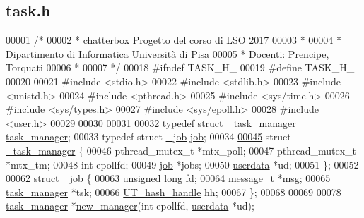 \hypertarget{task_8h_source}{}\subsection{task.\+h}

\begin{DoxyCode}
00001 \textcolor{comment}{/*}
00002 \textcolor{comment}{ * chatterbox Progetto del corso di LSO 2017}
00003 \textcolor{comment}{ *}
00004 \textcolor{comment}{ * Dipartimento di Informatica Università di Pisa}
00005 \textcolor{comment}{ * Docenti: Prencipe, Torquati}
00006 \textcolor{comment}{ *}
00007 \textcolor{comment}{ */}
00018 \textcolor{preprocessor}{#ifndef TASK\_H\_}
00019 \textcolor{preprocessor}{#define TASK\_H\_}
00020 
00021 \textcolor{preprocessor}{#include <stdio.h>}
00022 \textcolor{preprocessor}{#include <stdlib.h>}
00023 \textcolor{preprocessor}{#include <unistd.h>}
00024 \textcolor{preprocessor}{#include <pthread.h>}
00025 \textcolor{preprocessor}{#include <sys/time.h>}
00026 \textcolor{preprocessor}{#include <sys/types.h>}
00027 \textcolor{preprocessor}{#include <sys/epoll.h>}
00028 \textcolor{preprocessor}{#include <\mbox{\hyperlink{user_8h}{user.h}}>}
00029 
00030 
00031 
00032 \textcolor{keyword}{typedef} \textcolor{keyword}{struct }\mbox{\hyperlink{struct__task__manager}{\_task\_manager}} \mbox{\hyperlink{struct__task__manager}{task\_manager}};
00033 \textcolor{keyword}{typedef} \textcolor{keyword}{struct }\mbox{\hyperlink{struct__job}{\_job}} \mbox{\hyperlink{struct__job}{job}};
00034 
\mbox{\hyperlink{struct__task__manager}{00045}} \textcolor{keyword}{struct }\mbox{\hyperlink{struct__task__manager}{\_task\_manager}} \{
00046         pthread\_mutex\_t *mtx\_poll;
00047         pthread\_mutex\_t *mtx\_tm;
00048         \textcolor{keywordtype}{int} epollfd;
00049         \mbox{\hyperlink{struct__job}{job}} *jobs;
00050         \mbox{\hyperlink{struct__usersdata}{userdata}} *ud;
00051 \};
00052 
\mbox{\hyperlink{struct__job}{00062}} \textcolor{keyword}{struct }\mbox{\hyperlink{struct__job}{\_job}} \{
00063   \textcolor{keywordtype}{unsigned} \textcolor{keywordtype}{long} fd;
00064   \mbox{\hyperlink{structmessage__t}{message\_t}} *msg;
00065   \mbox{\hyperlink{struct__task__manager}{task\_manager}} *tsk;
00066   \mbox{\hyperlink{structUT__hash__handle}{UT\_hash\_handle}} hh;
00067 \};
00068 
00069 
00078 \mbox{\hyperlink{struct__task__manager}{task\_manager}} *\mbox{\hyperlink{task_8h_af4fb683e1349ea399ff8fb25cde2738e}{new\_manager}}(\textcolor{keywordtype}{int} epollfd, \mbox{\hyperlink{struct__usersdata}{userdata}} *ud);

\end{DoxyCode}
